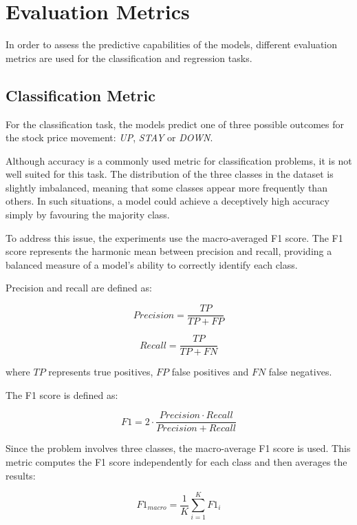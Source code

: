 \section{Evaluation Metrics}

In order to assess the predictive capabilities of the models, different evaluation metrics are used for the classification and regression tasks.

\subsection{Classification Metric}

For the classification task, the models predict one of three possible outcomes for the stock price movement:
\textit{UP}, \textit{STAY} or \textit{DOWN}.

Although accuracy is a commonly used metric for classification problems, it is not well suited for this task. The distribution of the three classes in the dataset is slightly imbalanced, meaning that some classes appear more frequently than others. In such situations, a model could achieve a deceptively high accuracy simply by favouring the majority class.

To address this issue, the experiments use the macro-averaged F1 score. The F1 score represents the harmonic mean between precision and recall, providing a balanced measure of a model's ability to correctly identify each class.

Precision and recall are defined as:

\begin{equation}
Precision = \frac{TP}{TP + FP}
\end{equation}

\begin{equation}
Recall = \frac{TP}{TP + FN}
\end{equation}

where $TP$ represents true positives, $FP$ false positives and $FN$ false negatives.

The F1 score is defined as:

\begin{equation}
F1 = 2 \cdot \frac{Precision \cdot Recall}{Precision + Recall}
\end{equation}

Since the problem involves three classes, the macro-average F1 score is used. This metric computes the F1 score independently for each class and then averages the results:

\begin{equation}
F1_{macro} = \frac{1}{K} \sum_{i=1}^{K} F1_i
\end{equation}

